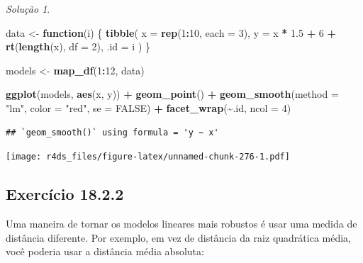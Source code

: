 \documentclass[
]{latex/krantz}
\newenvironment{Shaded}{\begin{snugshade}}{\end{snugshade}}
\newcommand{\AttributeTok}[1]{\textcolor[rgb]{0.13,0.29,0.53}{#1}}
\newcommand{\ConstantTok}[1]{\textcolor[rgb]{0.56,0.35,0.01}{#1}}
\newcommand{\ControlFlowTok}[1]{\textcolor[rgb]{0.13,0.29,0.53}{\textbf{#1}}}
\newcommand{\DecValTok}[1]{\textcolor[rgb]{0.00,0.00,0.81}{#1}}
\newcommand{\FloatTok}[1]{\textcolor[rgb]{0.00,0.00,0.81}{#1}}
\newcommand{\FunctionTok}[1]{\textcolor[rgb]{0.13,0.29,0.53}{\textbf{#1}}}
\newcommand{\NormalTok}[1]{#1}
\newcommand{\OtherTok}[1]{\textcolor[rgb]{0.56,0.35,0.01}{#1}}
\newcommand{\SpecialCharTok}[1]{\textcolor[rgb]{0.81,0.36,0.00}{\textbf{#1}}}
\newcommand{\StringTok}[1]{\textcolor[rgb]{0.31,0.60,0.02}{#1}}
\theoremstyle{definition}
\theoremstyle{definition}
\theoremstyle{definition}
\theoremstyle{definition}
\theoremstyle{remark}
\newtheorem*{solution}{Solução}
\begin{document}
\begin{solution}
\leavevmode

\begin{Shaded}
\begin{Highlighting}[]
\NormalTok{data }\OtherTok{\textless{}{-}} \ControlFlowTok{function}\NormalTok{(i) \{}
  \FunctionTok{tibble}\NormalTok{(}
    \AttributeTok{x =} \FunctionTok{rep}\NormalTok{(}\DecValTok{1}\SpecialCharTok{:}\DecValTok{10}\NormalTok{, }\AttributeTok{each =} \DecValTok{3}\NormalTok{),}
    \AttributeTok{y =}\NormalTok{ x }\SpecialCharTok{*} \FloatTok{1.5} \SpecialCharTok{+} \DecValTok{6} \SpecialCharTok{+} \FunctionTok{rt}\NormalTok{(}\FunctionTok{length}\NormalTok{(x), }\AttributeTok{df =} \DecValTok{2}\NormalTok{),}
    \AttributeTok{.id =}\NormalTok{ i}
\NormalTok{  )}
\NormalTok{\}}

\NormalTok{models }\OtherTok{\textless{}{-}} \FunctionTok{map\_df}\NormalTok{(}\DecValTok{1}\SpecialCharTok{:}\DecValTok{12}\NormalTok{, data)}

\FunctionTok{ggplot}\NormalTok{(models, }\FunctionTok{aes}\NormalTok{(x, y)) }\SpecialCharTok{+}
  \FunctionTok{geom\_point}\NormalTok{() }\SpecialCharTok{+}
  \FunctionTok{geom\_smooth}\NormalTok{(}\AttributeTok{method =} \StringTok{"lm"}\NormalTok{, }\AttributeTok{color =} \StringTok{"red"}\NormalTok{, }\AttributeTok{se =} \ConstantTok{FALSE}\NormalTok{) }\SpecialCharTok{+}
  \FunctionTok{facet\_wrap}\NormalTok{(}\SpecialCharTok{\textasciitilde{}}\NormalTok{.id, }\AttributeTok{ncol =} \DecValTok{4}\NormalTok{)}
\end{Highlighting}
\end{Shaded}

\begin{verbatim}
## `geom_smooth()` using formula = 'y ~ x'
\end{verbatim}

\texttt{[image: r4ds\_files/figure-latex/unnamed-chunk-276-1.pdf]}

\end{solution}

\hypertarget{exr18-2-2}{%
\subsection*{Exercício 18.2.2}\label{exr18-2-2}}

Uma maneira de tornar os modelos lineares mais robustos é usar uma medida de distância diferente. Por exemplo, em vez de distância da raiz quadrática média, você poderia usar a distância média absoluta:
\end{document}
